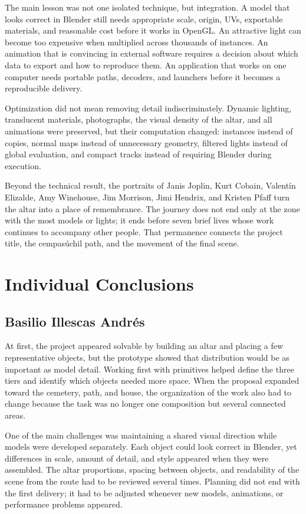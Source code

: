 \documentclass[letter,12pt]{article}
\begin{document}
	The main lesson was not one isolated technique, but integration. A model that looks correct in Blender still needs appropriate scale, origin, UVs, exportable materials, and reasonable cost before it works in OpenGL. An attractive light can become too expensive when multiplied across thousands of instances. An animation that is convincing in external software requires a decision about which data to export and how to reproduce them. An application that works on one computer needs portable paths, decoders, and launchers before it becomes a reproducible delivery.

	Optimization did not mean removing detail indiscriminately. Dynamic lighting, translucent materials, photographs, the visual density of the altar, and all animations were preserved, but their computation changed: instances instead of copies, normal maps instead of unnecessary geometry, filtered lights instead of global evaluation, and compact tracks instead of requiring Blender during execution.

	Beyond the technical result, the portraits of Janis Joplin, Kurt Cobain, Valentín Elizalde, Amy Winehouse, Jim Morrison, Jimi Hendrix, and Kristen Pfaff turn the altar into a place of remembrance. The journey does not end only at the zone with the most models or lights; it ends before seven brief lives whose work continues to accompany other people. That permanence connects the project title, the cempasúchil path, and the movement of the final scene.

	\section{Individual Conclusions}

	\subsection*{Basilio Illescas Andrés}
	At first, the project appeared solvable by building an altar and placing a few representative objects, but the prototype showed that distribution would be as important as model detail. Working first with primitives helped define the three tiers and identify which objects needed more space. When the proposal expanded toward the cemetery, path, and house, the organization of the work also had to change because the task was no longer one composition but several connected areas.

	One of the main challenges was maintaining a shared visual direction while models were developed separately. Each object could look correct in Blender, yet differences in scale, amount of detail, and style appeared when they were assembled. The altar proportions, spacing between objects, and readability of the scene from the route had to be reviewed several times. Planning did not end with the first delivery; it had to be adjusted whenever new models, animations, or performance problems appeared.
\end{document}
